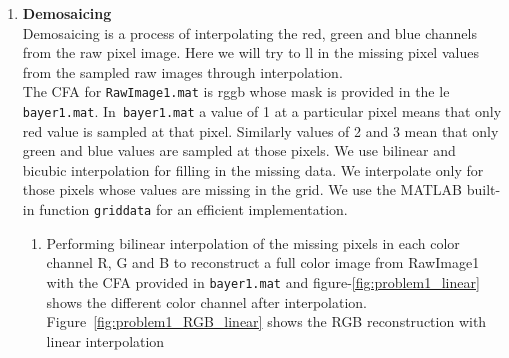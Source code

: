 \documentclass[11pt, a4]{article}
\begin{document}
\begin{enumerate}
		\item \textbf{Demosaicing}\\
		Demosaicing is a process of interpolating the red, green and blue channels from
		the raw pixel image. Here we will try to ll in the missing pixel values from
		the sampled raw images through interpolation. \\
		 The CFA for \texttt{RawImage1.mat} is rggb whose mask is provided in the le
		\texttt{bayer1.mat}. In\texttt{ bayer1.mat} a value of 1 at a particular pixel means that only
		red value is sampled at that pixel. Similarly values of 2 and 3 mean that
		only green and blue values are sampled at those pixels. We use bilinear and
		bicubic interpolation for filling in the missing data. We interpolate only for
		those pixels whose values are missing in the grid. We use the MATLAB built-in
		function \texttt{griddata} for an efficient implementation.
		\begin{enumerate}
			\item Performing bilinear interpolation of the missing pixels in each color channel	R, G and B to reconstruct a full color image from RawImage1 with the CFA provided in \texttt{bayer1.mat} and figure-\ref{fig:problem1_linear} shows the different color channel after interpolation. Figure~\ref{fig:problem1_RGB_linear} shows the RGB reconstruction with linear interpolation
			\begin{figure}[h]
				\centering
\end{figure}
\end{enumerate}
\end{enumerate}
\end{document}
